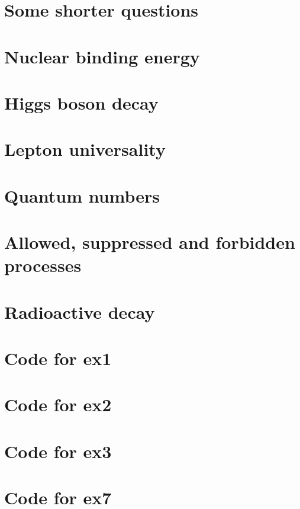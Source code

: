 \documentclass[]{article}
\begin{document}
\section{Some shorter questions}


\section{Nuclear binding energy}


\section{Higgs boson decay}


\section{Lepton universality}


\section{Quantum numbers}


\section{Allowed, suppressed and forbidden processes}


\section{Radioactive decay}


\section{Code for ex1}


\section{Code for ex2}


\section{Code for ex3}


\section{Code for ex7}

\end{document}
